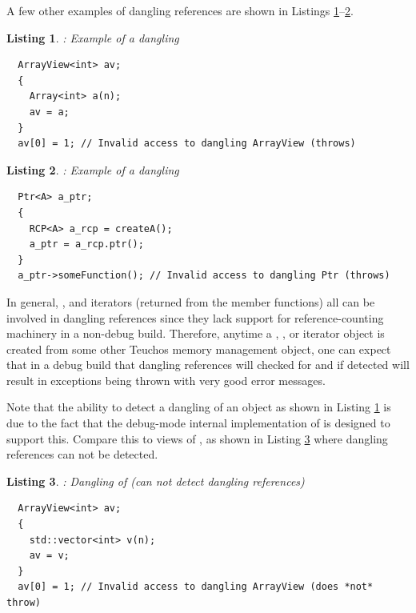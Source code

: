 \documentclass[pdf,ps2pdf,11pt]{SANDreport}
\newtheorem{listing}{Listing}
\begin{document}
A few other examples of dangling references are shown in Listings
{}\ref{listing:Array-dangling-ArrayView}--{}\ref{listing:RCP-dangling-Ptr}.

\begin{listing}: Example of a dangling {} \\
\label{listing:Array-dangling-ArrayView}
{\small\begin{verbatim}
  ArrayView<int> av;
  {
    Array<int> a(n);
    av = a;
  }
  av[0] = 1; // Invalid access to dangling ArrayView (throws)
\end{verbatim}}
\end{listing}

\begin{listing}: Example of a dangling {} \\
\label{listing:RCP-dangling-Ptr}
{\small\begin{verbatim}
  Ptr<A> a_ptr;
  {
    RCP<A> a_rcp = createA();
    a_ptr = a_rcp.ptr();
  }
  a_ptr->someFunction(); // Invalid access to dangling Ptr (throws)
\end{verbatim}}
\end{listing}


In general, {}, {} and iterators (returned
from the {} member functions) all can be involved in
dangling references since they lack support for reference-counting
machinery in a non-debug build.  Therefore, anytime a {},
{}, or iterator object is created from some other
Teuchos memory management object, one can expect that in a debug build
that dangling references will checked for and if detected will result
in exceptions being thrown with very good error messages.

Note that the ability to detect a dangling {} of an
{} object as shown in Listing
{}\ref{listing:Array-dangling-ArrayView} is due to the fact that the
debug-mode internal implementation of {} is designed to
support this.  Compare this to {} views of
{}, as shown in Listing
{}\ref{listing:vector-dangling-ArrayView} where dangling references
can not be detected.


{}\begin{listing}: Dangling {} of {}
(can not detect dangling references) \\
\label{listing:vector-dangling-ArrayView}
{\small\begin{verbatim}
  ArrayView<int> av;
  {
    std::vector<int> v(n);
    av = v;
  }
  av[0] = 1; // Invalid access to dangling ArrayView (does *not* throw)
\end{verbatim}}
\end{listing}
\end{document}
